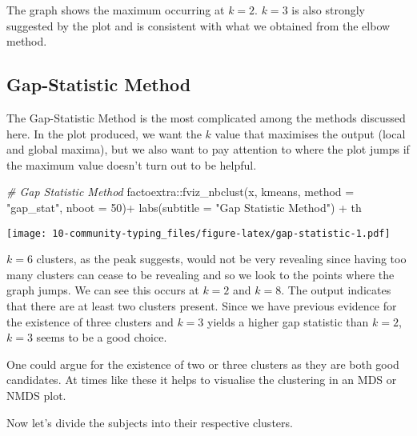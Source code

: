 \documentclass[
  oneside]{book}
\newenvironment{Shaded}{\begin{snugshade}}{\end{snugshade}}
\newcommand{\AttributeTok}[1]{\textcolor[rgb]{0.77,0.63,0.00}{#1}}
\newcommand{\CommentTok}[1]{\textcolor[rgb]{0.56,0.35,0.01}{\textit{#1}}}
\newcommand{\DecValTok}[1]{\textcolor[rgb]{0.00,0.00,0.81}{#1}}
\newcommand{\FunctionTok}[1]{\textcolor[rgb]{0.00,0.00,0.00}{#1}}
\newcommand{\NormalTok}[1]{#1}
\newcommand{\SpecialCharTok}[1]{\textcolor[rgb]{0.00,0.00,0.00}{#1}}
\newcommand{\StringTok}[1]{\textcolor[rgb]{0.31,0.60,0.02}{#1}}
\begin{document}
The graph shows the maximum occurring at \(k=2\). \(k=3\) is also strongly suggested by the plot and is consistent with what we obtained from the elbow method.

\hypertarget{gap-statistic-method}{%
\subsection{Gap-Statistic Method}\label{gap-statistic-method}}

The Gap-Statistic Method is the most complicated among the methods discussed here. In the plot produced, we want the \(k\) value that maximises the output (local and global maxima), but we also want to pay attention to where the plot jumps if the maximum value doesn't turn out to be helpful.

\begin{Shaded}
\begin{Highlighting}[]
\CommentTok{\# Gap Statistic Method}
\NormalTok{factoextra}\SpecialCharTok{::}\FunctionTok{fviz\_nbclust}\NormalTok{(x, kmeans, }\AttributeTok{method =} \StringTok{"gap\_stat"}\NormalTok{, }\AttributeTok{nboot =} \DecValTok{50}\NormalTok{)}\SpecialCharTok{+}
                         \FunctionTok{labs}\NormalTok{(}\AttributeTok{subtitle =} \StringTok{"Gap Statistic Method"}\NormalTok{) }\SpecialCharTok{+}\NormalTok{ th}
\end{Highlighting}
\end{Shaded}

\texttt{[image: 10-community-typing\_files/figure-latex/gap-statistic-1.pdf]}

\(k=6\) clusters, as the peak suggests, would not be very revealing since having too many clusters can cease to be revealing and so we look to the points where the graph jumps. We can see this occurs at \(k=2\) and \(k=8\). The output indicates that there are at least two clusters present. Since we have previous evidence for the existence of three clusters and \(k=3\) yields a higher gap statistic than \(k=2\), \(k=3\) seems to be a good choice.

One could argue for the existence of two or three clusters as they are both good candidates. At times like these it helps to visualise the clustering in an MDS or NMDS plot.

Now let's divide the subjects into their respective clusters.
\end{document}
